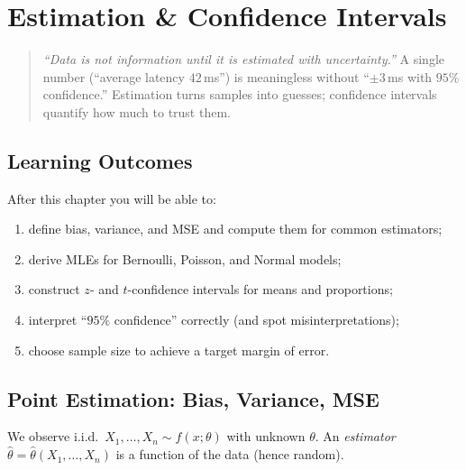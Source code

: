 \chapter{Estimation \& Confidence Intervals}
\label{ch:estimation}

\begin{quote}
\emph{``Data is not information until it is estimated with uncertainty.''} A single number (``average latency $42\,$ms'') is meaningless without ``$\pm3\,$ms with $95\%$ confidence.'' Estimation turns samples into guesses; confidence intervals quantify how much to trust them.
\end{quote}

\noindent{}
\vspace{0.4em}

\section*{Learning Outcomes}
After this chapter you will be able to:
\begin{enumerate}[label=(L\arabic*)]
    \item define bias, variance, and MSE and compute them for common estimators;
    \item derive MLEs for Bernoulli, Poisson, and Normal models;
    \item construct $z$- and $t$-confidence intervals for means and proportions;
    \item interpret ``$95\%$ confidence'' correctly (and spot misinterpretations);
    \item choose sample size to achieve a target margin of error.
\end{enumerate}

\section{Point Estimation: Bias, Variance, MSE}
\label{sec:point-estimation}
We observe i.i.d.\ $X_1,\dots,X_n\sim f(x;\theta)$ with unknown $\theta$. An \emph{estimator} $\hat\theta=\hat\theta(X_1,\dots,X_n)$ is a function of the data (hence random).

